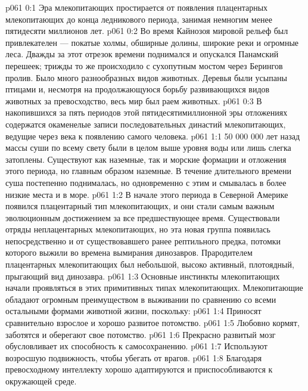 \author{Носитель Жизни}
\vs p061 0:1 Эра млекопитающих простирается от появления плацентарных млекопитающих до конца ледникового периода, занимая немногим менее пятидесяти миллионов лет.
\vs p061 0:2 Во время Кайнозоя мировой рельеф был привлекателен --- покатые холмы, обширные долины, широкие реки и огромные леса. Дважды за этот отрезок времени поднимался и опускался Панамский перешеек; трижды то же происходило с сухопутным мостом через Берингов пролив. Было много разнообразных видов животных. Деревья были усыпаны птицами и, несмотря на продолжающуюся борьбу развивающихся видов животных за превосходство, весь мир был раем животных.
\vs p061 0:3 В накопившихся за пять периодов этой пятидесятимиллионной эры отложениях содержатся окаменелые записи последовательных династий млекопитающих, ведущие через века к появлению самого человека.
\vs p061 1:1 50 000 000 лет назад массы суши по всему свету были в целом выше уровня воды или лишь слегка затоплены. Существуют как наземные, так и морские формации и отложения этого периода, но главным образом наземные. В течение длительного времени суша постепенно поднималась, но одновременно с этим и смывалась в более низкие места и в море.
\vs p061 1:2 В начале этого периода в Северной Америке  появился плацентарный тип млекопитающих, и они стали самым важным эволюционным достижением за все предшествующее время. Существовали отряды неплацентарных млекопитающих, но эта новая группа появилась непосредственно и  от существовавшего ранее рептильного предка, потомки которого выжили во времена вымирания динозавров. Прародителем плацентарных млекопитающих был небольшой, высоко активный, плотоядный, прыгающий вид динозавра.
\vs p061 1:3 Основные инстинкты млекопитающих начали проявляться в этих примитивных типах млекопитающих. Млекопитающие обладают огромным преимуществом в выживании по сравнению со всеми остальными формами животной жизни, поскольку:
\vs p061 1:4 \bibnobreakspace Приносят сравнительно взрослое и хорошо развитое потомство.
\vs p061 1:5 \bibnobreakspace Любовно кормят, заботятся и оберегают свое потомство.
\vs p061 1:6 \pc {}\bibnobreakspace Прекрасно развитый мозг обусловливает их способность к самосохранению.
\vs p061 1:7 \bibnobreakspace Используют возросшую подвижность, чтобы убегать от врагов.
\vs p061 1:8 \bibnobreakspace Благодаря превосходному интеллекту хорошо адаптируются и приспособливаются к окружающей среде.
